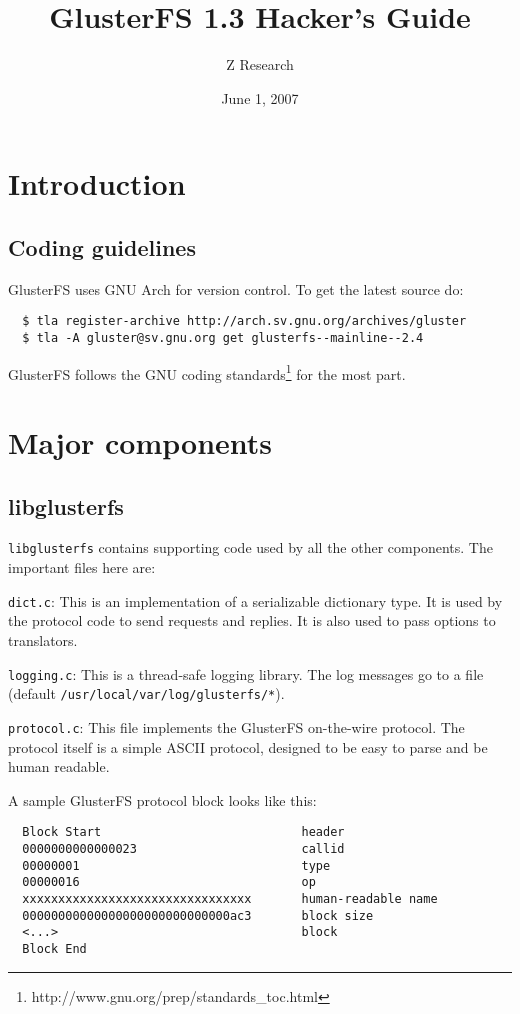 \documentclass{book}[12pt]
\begin{document}

\author{Z Research}
\title{GlusterFS 1.3 Hacker's Guide}
\date{June 1, 2007}

\maketitle
\frontmatter
\tableofcontents

\mainmatter
\chapter{Introduction}

\section{Coding guidelines}
GlusterFS uses GNU Arch for version control. To get the latest source do:
\begin{verbatim}
  $ tla register-archive http://arch.sv.gnu.org/archives/gluster
  $ tla -A gluster@sv.gnu.org get glusterfs--mainline--2.4
\end{verbatim}
\noindent
GlusterFS follows the GNU coding
standards\footnote{http://www.gnu.org/prep/standards\_toc.html} for the
most part.

\chapter{Major components}
\section{libglusterfs}
\texttt{libglusterfs} contains supporting code used by all the other components. 
The important files here are:

\texttt{dict.c}: This is an implementation of a serializable dictionary type. It is
used by the protocol code to send requests and replies. It is also used to pass options
to translators.

\texttt{logging.c}: This is a thread-safe logging library. The log messages go to a
file (default \texttt{/usr/local/var/log/glusterfs/*}).

\texttt{protocol.c}: This file implements the GlusterFS on-the-wire
protocol. The protocol itself is a simple ASCII protocol, designed to
be easy to parse and be human readable.

A sample GlusterFS protocol block looks like this:
\begin{verbatim}
  Block Start                            header
  0000000000000023                       callid
  00000001                               type
  00000016                               op
  xxxxxxxxxxxxxxxxxxxxxxxxxxxxxxxx       human-readable name
  00000000000000000000000000000ac3       block size
  <...>                                  block
  Block End
\end{verbatim}
\end{document}
